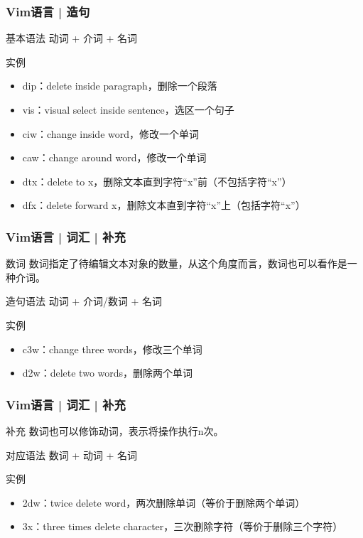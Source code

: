\begin{frame}
  \frametitle{Vim语言 | 造句}
  \begin{block}{基本语法}
  动词 + 介词 + 名词
  \end{block}
  \pause
  \begin{block}{实例}
    \begin{itemize}
      \item dip：delete inside paragraph，删除一个段落
      \item vis：visual select inside sentence，选区一个句子
      \item ciw：change inside word，修改一个单词
      \item caw：change around word，修改一个单词
      \item dtx：delete to x，删除文本直到字符“x”前（不包括字符“x”）
      \item dfx：delete forward x，删除文本直到字符“x”上（包括字符“x”）
    \end{itemize}
  \end{block}
\end{frame}

\begin{frame}
  \frametitle{Vim语言 | 词汇 | 补充}
  \begin{block}{数词}
    数词指定了待编辑文本对象的数量，从这个角度而言，数词也可以看作是一种介词。
  \end{block}
  \pause
  \begin{block}{造句语法}
  动词 + 介词/数词 + 名词
  \end{block}
  \pause
  \begin{block}{实例}
    \begin{itemize}
      \item c3w：change three words，修改三个单词
      \item d2w：delete two words，删除两个单词
    \end{itemize}
  \end{block}
\end{frame}

\begin{frame}
  \frametitle{Vim语言 | 词汇 | 补充}
  \begin{block}{补充}
    数词也可以修饰动词，表示将操作执行n次。
  \end{block}
  \pause
  \begin{block}{对应语法}
  数词 + 动词 + 名词
  \end{block}
  \pause
  \begin{block}{实例}
    \begin{itemize}
      \item 2dw：twice delete word，两次删除单词（等价于删除两个单词）
      \item 3x：three times delete character，三次删除字符（等价于删除三个字符）
    \end{itemize}
  \end{block}
\end{frame}

